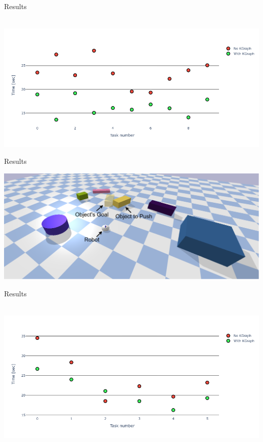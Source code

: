 \begin{frame}[fragile]{Results} 
\begin{center}
  \hbox{\hspace{-0.7cm} \includegraphics[width=1.05\textwidth]{figures/results/random_drive_time_vs}}
\end{center}
\end{frame}

\begin{frame}[fragile]{Results} 
\begin{center}
   \includegraphics[width=1.0\textwidth]{figures/results/random_1.drawio}
\end{center}
\end{frame}


\begin{frame}[fragile]{Results} 
\begin{center}
  \hbox{\hspace{-0.7cm} \includegraphics[width=1.1\textwidth]{figures/results/random_push_time_vs}}
\end{center}
\end{frame}


